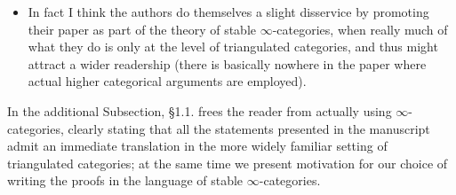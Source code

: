 \documentclass{article}
\begin{document}
  \begin{itemize}
  \item In fact I think the authors do themselves a slight disservice by promoting their paper as part of the theory of stable $\infty$-categories, when really
  much of what they do is only at the level of triangulated categories,
  and thus might attract a wider readership (there is basically nowhere in
  the paper where actual higher categorical arguments are employed).
 \end{itemize}
In the additional Subsection, \S1.1. frees the reader from actually using $\infty$-categories, clearly stating that all the statements presented in the manuscript admit an immediate translation in the more widely familiar setting of triangulated categories; at the same time we present motivation for our choice of writing the proofs in the language of stable $\infty$-categories.
\end{document}
